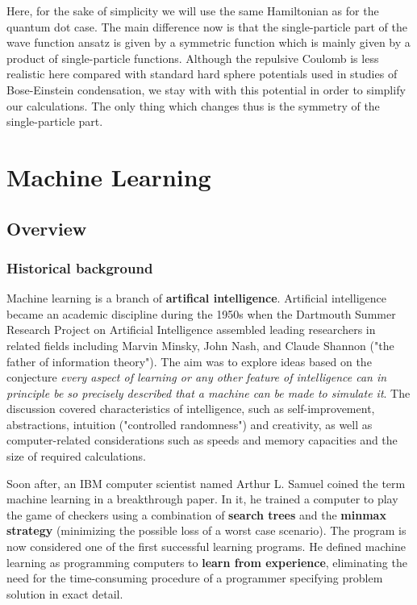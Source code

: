 \documentclass[twoside,english]{uiofysmaster}
\begin{document}
Here, for the sake of simplicity we will use the same Hamiltonian as
for the quantum dot case. The main difference now is that
the single-particle part of the wave function ansatz is given by a symmetric
function which is mainly given by a product of single-particle
functions. Although the repulsive Coulomb is less realistic here
compared with standard hard sphere potentials used in studies of
Bose-Einstein condensation, we stay with with this potential in order
to simplify our calculations. The only thing which changes thus is the
symmetry of the single-particle part. 

\chapter{Machine Learning}
\section{Overview}
\subsection{Historical background}
\label{sec:MLhistory}
Machine learning is a branch of \textbf{artifical intelligence}. Artificial intelligence became an academic discipline during the 1950s when the Dartmouth Summer Research Project on Artificial Intelligence assembled leading researchers in related fields including Marvin Minsky, John Nash, and Claude Shannon ("the father of information theory"). The aim was to explore ideas based on the conjecture \textit{every aspect of learning or any other feature of intelligence can in principle be so precisely described that a machine can be made to simulate it}. The discussion covered characteristics of intelligence, such as self-improvement, abstractions, intuition ("controlled randomness") and creativity, as well as computer-related considerations such as speeds and memory capacities and the size of required calculations.

Soon after, an IBM computer scientist named Arthur L. Samuel coined the term machine learning in a breakthrough paper. In it, he trained a computer to play the game of checkers using a combination of \textbf{search trees} and the \textbf{minmax strategy} (minimizing the possible loss of a worst case scenario). The program is now considered one of the first successful learning programs. He defined machine learning as programming computers to \textbf{learn from experience}, eliminating the need for the time-consuming procedure of a programmer specifying problem solution in exact detail. 
\end{document}
